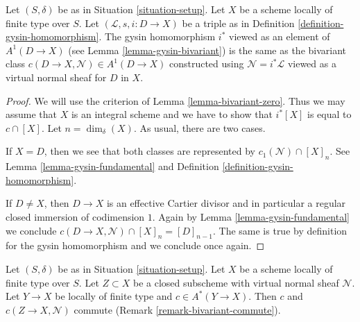 \begin{lemma}
\label{lemma-gysin-agrees}
Let $(S, \delta)$ be as in Situation \ref{situation-setup}. Let $X$ be a scheme
locally of finite type over $S$. Let $(\mathcal{L}, s, i : D \to X)$
be a triple as in Definition \ref{definition-gysin-homomorphism}.
The gysin homomorphism $i^*$ viewed as an element of $A^1(D \to X)$
(see Lemma \ref{lemma-gysin-bivariant}) is the same as the bivariant class
$c(D \to X, \mathcal{N}) \in A^1(D \to X)$
constructed using $\mathcal{N} = i^*\mathcal{L}$
viewed as a virtual normal sheaf for $D$ in $X$.
\end{lemma}

\begin{proof}
We will use the criterion of Lemma \ref{lemma-bivariant-zero}.
Thus we may assume that $X$ is an integral scheme and
we have to show that $i^*[X]$ is equal to $c \cap [X]$.
Let $n = \dim_\delta(X)$. As usual, there are two cases.

\medskip\noindent
If $X = D$, then we see that both classes are represented by
$c_1(\mathcal{N}) \cap [X]_n$. See Lemma \ref{lemma-gysin-fundamental}
and Definition \ref{definition-gysin-homomorphism}.

\medskip\noindent
If $D \not = X$, then $D \to X$ is an effective Cartier divisor
and in particular a regular closed immersion of codimension $1$.
Again by Lemma \ref{lemma-gysin-fundamental} we conclude
$c(D \to X, \mathcal{N}) \cap [X]_n = [D]_{n - 1}$. The same
is true by definition for the gysin homomorphism and we conclude
once again.
\end{proof}

\begin{lemma}
\label{lemma-gysin-commutes}
Let $(S, \delta)$ be as in Situation \ref{situation-setup}. Let $X$ be a scheme
locally of finite type over $S$. Let $Z \subset X$ be a closed subscheme
with virtual normal sheaf $\mathcal{N}$. Let $Y \to X$ be locally of
finite type and $c \in A^*(Y \to X)$. Then $c$ and $c(Z \to X, \mathcal{N})$
commute (Remark \ref{remark-bivariant-commute}).
\end{lemma}

